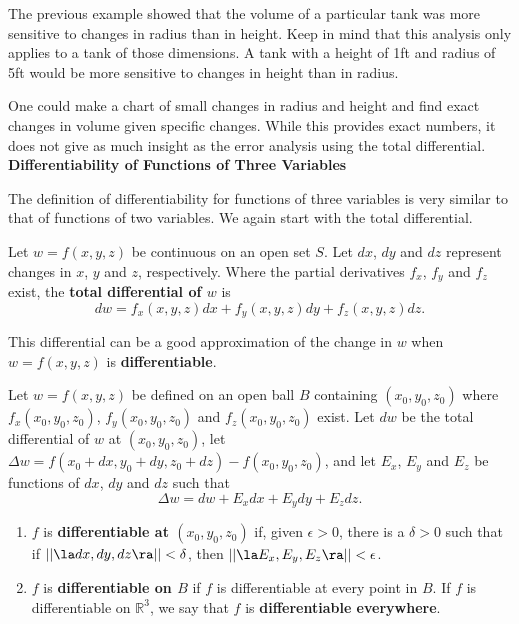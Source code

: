 The previous example showed that the volume of a particular tank was more sensitive to changes in radius than in height. Keep in mind that this analysis only applies to a tank of those dimensions. A tank with a height of 1ft and radius of 5ft would be more sensitive to changes in height than in radius.

One could make a chart of small changes in radius and height and find exact changes in volume given specific changes. While this provides exact numbers, it does not give as much insight as the error analysis using the total differential.\\

\noindent\textbf{\large Differentiability of Functions of Three Variables}

The definition of differentiability for functions of three variables is very similar to that of functions of two variables. We again start with the total differential.

{Let $w=f(x,y,z)$ be continuous on an open set $S$. Let $dx$, $dy$ and $dz$ represent changes in $x$, $y$ and  $z$, respectively. Where the partial derivatives $f_x$, $f_y$ and $f_z$ exist, the \textbf{total differential of $w$} is
$$dw = f_x(x,y,z)dx + f_y(x,y,z)dy+f_z(x,y,z)dz.$$
}

This differential can be a good approximation of the change in $w$ when $w = f(x,y,z)$ is \textbf{differentiable}.

{Let $w=f(x,y,z)$ be defined on an open ball $B$ containing $(x_0,y_0,z_0)$ where $f_x(x_0,y_0,z_0)$, $f_y(x_0,y_0,z_0)$ and $f_z(x_0,y_0,z_0)$ exist. Let $dw$ be the total differential of $w$ at $(x_0,y_0,z_0)$, let $\Delta w = f(x_0+dx,y_0+dy,z_0+dz) - f(x_0,y_0,z_0)$, and let $E_x$, $E_y$ and $E_z$ be functions of $dx$, $dy$ and $dz$  such that
$$\Delta w = dw + E_xdx + E_ydy + E_zdz.$$
\begin{enumerate}
	\item $f$ is \textbf{differentiable at $(x_0,y_0,z_0)$} if, given $\epsilon >0$, there is a $\delta >0$ such that if $||\la dx,dy,dz\ra|| < \delta$, then $||\la E_x,E_y,E_z\ra|| < \epsilon$. 
	\item	$f$ is \textbf{differentiable on $B$} if $f$ is differentiable at every point in $B$. If $f$ is differentiable on $\mathbb{R}^3$, we say that $f$ is \textbf{differentiable everywhere}.
\end{enumerate}
}

